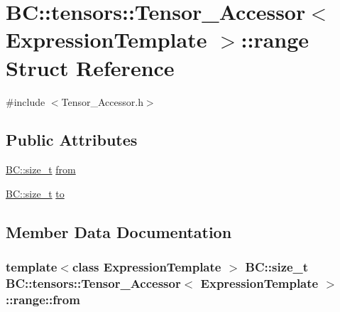 \hypertarget{structBC_1_1tensors_1_1Tensor__Accessor_1_1range}{}\section{BC\+:\+:tensors\+:\+:Tensor\+\_\+\+Accessor$<$ Expression\+Template $>$\+:\+:range Struct Reference}
\label{structBC_1_1tensors_1_1Tensor__Accessor_1_1range}


{\ttfamily \#include $<$Tensor\+\_\+\+Accessor.\+h$>$}

\subsection*{Public Attributes}
\begin{DoxyCompactItemize}
\item 
\hyperlink{namespaceBC_a6007cbc4eeec401a037b558910a56173}{B\+C\+::size\+\_\+t} \hyperlink{structBC_1_1tensors_1_1Tensor__Accessor_1_1range_ab7335e0cf3981e865ee88a5b0200e671}{from}
\item 
\hyperlink{namespaceBC_a6007cbc4eeec401a037b558910a56173}{B\+C\+::size\+\_\+t} \hyperlink{structBC_1_1tensors_1_1Tensor__Accessor_1_1range_a907988ad0fab013140ea8b1d59861d9d}{to}
\end{DoxyCompactItemize}


\subsection{Member Data Documentation}
\subsubsection[{\texorpdfstring{from}{from}}]{\setlength{\rightskip}{0pt plus 5cm}template$<$class Expression\+Template $>$ {\bf B\+C\+::size\+\_\+t} {\bf B\+C\+::tensors\+::\+Tensor\+\_\+\+Accessor}$<$ Expression\+Template $>$\+::range\+::from}\hypertarget{structBC_1_1tensors_1_1Tensor__Accessor_1_1range_ab7335e0cf3981e865ee88a5b0200e671}{}\label{structBC_1_1tensors_1_1Tensor__Accessor_1_1range_ab7335e0cf3981e865ee88a5b0200e671}
